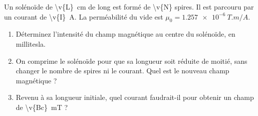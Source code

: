 Un solénoïde de \qty{\v{L}}{cm} de long est formé de \num{\v{N}} spires. Il est parcouru par un courant de \qty{\v{I}}{A}. La perméabilité du vide est $\mu_0 = \qty{1.257e-6}{T.m/A}$.

\begin{enumerate}[label=\alph*)]
    \item Déterminez l'intensité du champ magnétique au centre du solénoïde, en millitesla.
    \item On comprime le solénoïde pour que sa longueur soit réduite de moitié, sans changer le nombre de spires ni le courant. Quel est le nouveau champ magnétique ?
    \item Revenu à sa longueur initiale, quel courant faudrait-il pour obtenir un champ de \qty{\v{Bc}}{mT} ?
\end{enumerate}
